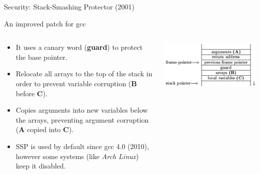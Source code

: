 \begin{frame}{Security: Stack-Smashing Protector (2001)}
	\begin{block}{An improved patch for gcc}
		\begin{columns}
			\begin{column}{.5\textwidth}
		\begin{itemize}
			\item It uses a canary word (\textbf{guard}) to protect the base pointer.
			\item Relocate all arrays to the top of the stack in order to prevent variable corruption (\textbf{B} before \textbf{C}).
			\item Copies arguments into new variables below the arrays, preventing argument corruption (\textbf{A} copied into \textbf{C}).
			\item SSP is used by default since gcc 4.0 (2010), however some systems (like \emph{Arch Linux}) keep it disabled.
		\end{itemize}
			\end{column}
			\begin{column}{.5\textwidth}
				\includegraphics[width=\textwidth]{imgs/sec-ssp.png}
			\end{column}
		\end{columns}
	\end{block}
\end{frame}

